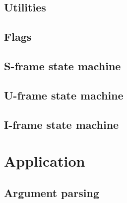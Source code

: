 \documentclass[a4paper, 11pt]{report}
\begin{document}
\subsection{Utilities}



\begin{landscape}
\subsection{Flags}

\end{landscape}

\subsection{S-frame state machine}



\subsection{U-frame state machine}



\subsection{I-frame state machine}



\section{Application}



\subsection{Argument parsing}


\end{document}
